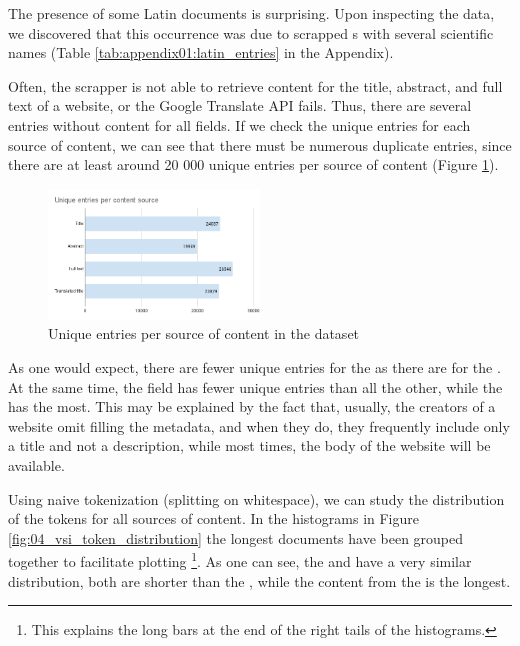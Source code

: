 The presence of some Latin documents is surprising. Upon inspecting the data, we discovered that this occurrence was due to scrapped \trafilaturaTitle{}s with several scientific names (Table \ref{tab:appendix01:latin_entries} in the Appendix).

Often, the \trafilatura{} scrapper is not able to retrieve content for the title, abstract, and full text of a website, or the Google Translate API fails. Thus, there are several entries without content for all fields. If we check the unique entries for each source of content, we can see that there must be numerous duplicate entries, since there are at least around 20 000 unique entries per source of content (Figure \ref{fig:04_unique_entries_vsi}).

\begin{figure}
    \centering
    \includegraphics[width=0.50\textwidth]{Figures/04/Unique entries per content source.png}
    \caption{Unique entries per source of content in the \VSI{} dataset}
    \label{fig:04_unique_entries_vsi}
\end{figure}

As one would expect, there are fewer unique entries for the \translationTitle{} as there are for the \trafilaturaTitle{}. At the same time, the \trafilaturaAbstract{} field has fewer unique entries than all the other, while the \trafilaturaFulltext{} has the most. This may be explained by the fact that, usually, the creators of a website omit filling the metadata, and when they do, they frequently include only a title and not a description, while most times, the body of the website will be available. 

Using naive tokenization (splitting on whitespace), we can study the distribution of the tokens for all sources of content. In the histograms in Figure \ref{fig:04_vsi_token_distribution} the longest documents have been grouped together to facilitate plotting \footnote{This explains the long bars at the end of the right tails of the histograms.}. As one can see, the \trafilaturaTitle{} and \translationTitle{} have a very similar distribution, both are shorter than the \trafilaturaAbstract{}, while the content from the \trafilaturaFulltext{} is the longest.

